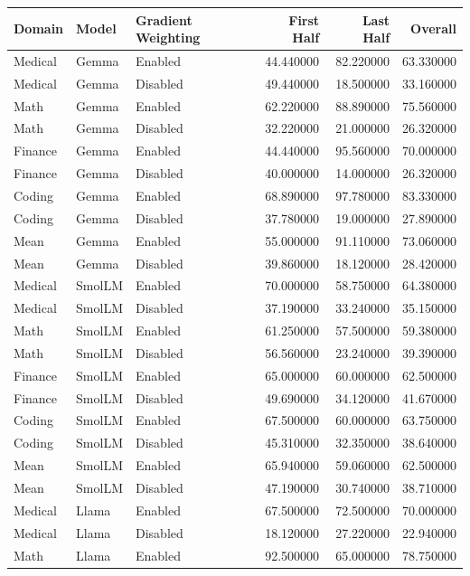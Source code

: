 \begin{tabular}{lllrrr}
\toprule
Domain & Model & Gradient Weighting & First Half & Last Half & Overall \\
\midrule
Medical & Gemma & Enabled & 44.440000 & 82.220000 & 63.330000 \\
Medical & Gemma & Disabled & 49.440000 & 18.500000 & 33.160000 \\
Math & Gemma & Enabled & 62.220000 & 88.890000 & 75.560000 \\
Math & Gemma & Disabled & 32.220000 & 21.000000 & 26.320000 \\
Finance & Gemma & Enabled & 44.440000 & 95.560000 & 70.000000 \\
Finance & Gemma & Disabled & 40.000000 & 14.000000 & 26.320000 \\
Coding & Gemma & Enabled & 68.890000 & 97.780000 & 83.330000 \\
Coding & Gemma & Disabled & 37.780000 & 19.000000 & 27.890000 \\
Mean & Gemma & Enabled & 55.000000 & 91.110000 & 73.060000 \\
Mean & Gemma & Disabled & 39.860000 & 18.120000 & 28.420000 \\
Medical & SmolLM & Enabled & 70.000000 & 58.750000 & 64.380000 \\
Medical & SmolLM & Disabled & 37.190000 & 33.240000 & 35.150000 \\
Math & SmolLM & Enabled & 61.250000 & 57.500000 & 59.380000 \\
Math & SmolLM & Disabled & 56.560000 & 23.240000 & 39.390000 \\
Finance & SmolLM & Enabled & 65.000000 & 60.000000 & 62.500000 \\
Finance & SmolLM & Disabled & 49.690000 & 34.120000 & 41.670000 \\
Coding & SmolLM & Enabled & 67.500000 & 60.000000 & 63.750000 \\
Coding & SmolLM & Disabled & 45.310000 & 32.350000 & 38.640000 \\
Mean & SmolLM & Enabled & 65.940000 & 59.060000 & 62.500000 \\
Mean & SmolLM & Disabled & 47.190000 & 30.740000 & 38.710000 \\
Medical & Llama & Enabled & 67.500000 & 72.500000 & 70.000000 \\
Medical & Llama & Disabled & 18.120000 & 27.220000 & 22.940000 \\
Math & Llama & Enabled & 92.500000 & 65.000000 & 78.750000 \\

\end{tabular}
